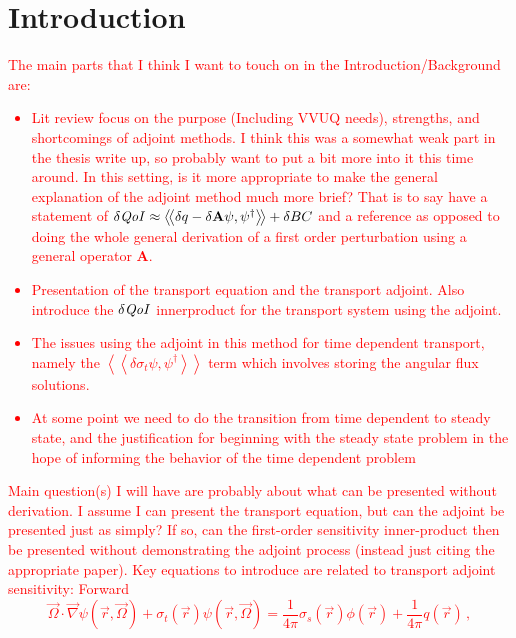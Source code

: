 \documentclass[review]{elsarticle}
\newcommand{\vr}{\vec{r}}
\newcommand{\vO}{\vec{\Omega}}
\newcommand{\braSN}{\left\langle \! \left\langle}
\newcommand{\ketSN}{\right\rangle \! \right\rangle}
\newcommand{\grad}{\vec{\nabla}}
\newcommand{\sigt}{\sigma_t}
\newcommand{\sigs}{\sigma_s}
\newcommand{\qoi}{{\it QoI}\xspace}
\newcommand{\comment}[2]{\marginpar{\textcolor{#2}{$\star$}}\textcolor{#2}{#1}\newline}
\newcommand{\iwh}[1]{\comment{#1}{red}}
\newcommand{\iwh}[1]{\phantom{a}}
\begin{document}
\section{Introduction}
\iwh{
The main parts that I think I want to touch on in the Introduction/Background are:
\begin{itemize}
\item Lit review focus on the purpose (Including VVUQ needs), strengths, and shortcomings of adjoint methods. I think this was a somewhat weak part in the thesis write up, so probably want to put a bit more into it this time around. In this setting, is it more appropriate to make the general explanation of the adjoint method much more brief? That is to say have a statement of $\delta \qoi \approx \braSN \delta q - \delta \mathbf{A} \psi , \psi^\dag \ketSN + \delta BC$ and a reference as opposed to doing the whole general derivation of a first order perturbation using a general operator $\mathbf{A}$.
\item Presentation of the transport equation and the transport adjoint. Also introduce the $\delta \qoi$ innerproduct for the transport system using the adjoint.
\item The issues using the adjoint in this method for time dependent transport, namely the $\braSN  \delta \sigt \psi , \psi^\dag \ketSN$ term which involves storing the angular flux solutions. 
\item At some point we need to do the transition from time dependent to steady state, and the justification for beginning with the steady state problem in the hope of informing the behavior of the time dependent problem
\end{itemize}
Main question(s) I will have are probably about what can be presented without derivation. I assume I can present the transport equation, but can the adjoint be presented just as simply? If so, can the first-order sensitivity inner-product then be presented without demonstrating the adjoint process (instead just citing the appropriate paper). Key equations to introduce are related to transport adjoint sensitivity:
Forward
\begin{subequations}\label{eqs:TransportSystem}
\begin{equation}
\label{SS1GTE}
\vO \cdot \grad \psi(\vr,\vO) + \sigt(\vr) \psi(\vr,\vO) = \frac{1}{4 \pi} \sigs(\vr) \phi(\vr) + \frac{1}{4 \pi} q(\vr)\, ,
\end{equation}

\end{subequations}}
\end{document}
